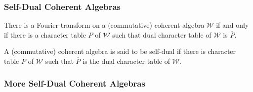 \documentclass[notheorems]{beamer}
\theoremstyle{definition} %
\begin{document}
\begin{frame}

\frametitle{Self-Dual Coherent Algebras}

	There is a Fourier transform on a (commutative) coherent algebra $\mathcal{W}$ if and only if there is a character table $P$ of $\mathcal{W}$
	such that dual character table of $\mathcal{W}$ is $\overline{P}$.

	\vspace{1em}

	A (commutative) coherent algebra is said to be self-dual if there is character table $P$ of $\mathcal{W}$ such that $\overline{P}$ is the dual character table of $\mathcal{W}$.

\end{frame}

\begin{frame}

\frametitle{More Self-Dual Coherent Algebras}




\end{frame}
\end{document}
